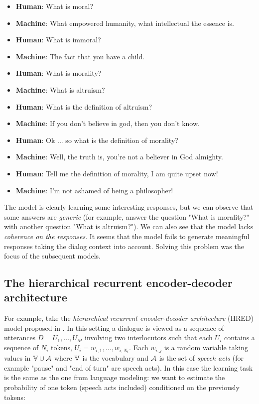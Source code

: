 \begin{itemize}
\item \textbf{Human}: What is moral?
\item \textbf{Machine}: What empowered humanity, what intellectual the essence is.
\item \textbf{Human}: What is immoral?
\item \textbf{Machine}: The fact that you have a child.
\item \textbf{Human}: What is morality?
\item \textbf{Machine}: What is altruism?
\item \textbf{Human}: What is the definition of altruism?
\item \textbf{Machine}: If you don’t believe in god, then you don’t know.
\item \textbf{Human}: Ok ... so what is the definition of morality?
\item \textbf{Machine}: Well, the truth is, you're not a believer in God almighty.
\item \textbf{Human}: Tell me the definition of morality, I am quite upset now!
\item \textbf{Machine}: I’m not ashamed of being a philosopher! 
\end{itemize}

The model is clearly learning some interesting responses, but we can observe that some answers are \textit{generic} (for example, answer the question "What is morality?" with another question "What is altruism?"). We can also see that the model lacks \textit{coherence on the responses}. It seems that the model fails to generate meaningful responses taking the dialog context into account. Solving this problem was the focus of the subsequent models.  

\subsection{The hierarchical recurrent encoder-decoder architecture} 

For example, take the \textit{hierarchical recurrent encoder-decoder architecture} (HRED) model proposed in \cite{Serban:2016a}. In this setting a dialogue is viewed as a sequence of utterances $D= U_1 , \dots, U_M$ involving two interlocutors such that each $U_i$ contains a sequence of $N_i$ tokens, $U_i = w_{i,1} , \dots, w_{i,N_{i}}$. Each $w_{i,j}$ is a random variable taking values in $\mathbb{V}\cup \mathcal{A}$ where $\mathbb{V}$ is the vocabulary and $\mathcal{A}$ is the set of \textit{speech acts} (for example "pause" and "end of turn" are  speech acts). In this case the learning task is the same as the one from language modeling: we want to estimate the probability of one token (speech acts included) conditioned on the previously tokens:

